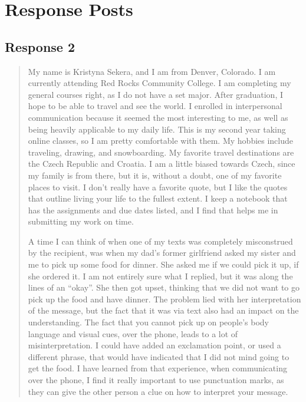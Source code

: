 
\section{Response Posts}
  \subsection{Response 2}
    \begin{quotation}
      My name is Kristyna Sekera, and I am from Denver, Colorado. I am currently
        attending Red Rocks Community College. I am completing my general
        courses right, as I do not have a set major. After graduation, I hope
        to be able to travel and see the world. I enrolled in interpersonal
        communication because it seemed the most interesting to me, as well as
        being heavily applicable to my daily life. This is my second year taking
        online classes, so I am pretty comfortable with them. My hobbies include
        traveling, drawing, and snowboarding. My favorite travel destinations
        are the Czech Republic and Croatia. I am a little biased towards Czech,
        since my family is from there, but it is, without a doubt, one of my
        favorite places to visit. I don’t really have a favorite quote, but I
        like the quotes that outline living your life to the fullest extent. I
        keep a notebook that has the assignments and due dates listed, and I
        find that helps me in submitting my work on time.

      A time I can think of when one of my texts was completely misconstrued by
        the recipient, was when my dad’s former girlfriend asked my sister and
        me to pick up some food for dinner. She asked me if we could pick it up,
        if she ordered it. I am not entirely sure what I replied, but it was
        along the lines of an “okay”. She then got upset, thinking that we did
        not want to go pick up the food and have dinner. The problem lied with
        her interpretation of the message, but the fact that it was via text
        also had an impact on the understanding. The fact that you cannot pick
        up on people’s body language and visual cues, over the phone, leads to
        a lot of misinterpretation. I could have added an exclamation point, or
        used a different phrase, that would have indicated that I did not mind
        going to get the food. I have learned from that experience, when
        communicating over the phone, I find it really important to use
        punctuation marks, as they can give the other person a clue on how to
        interpret your message.
    \end{quotation}

